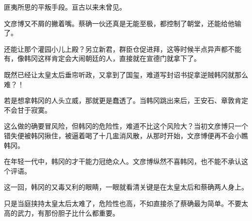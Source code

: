 匪夷所思的平叛手段。亘古以来未曾见。

文彦博又不屑的撇着嘴。蔡确一伙还真是无能至极，都控制了朝堂，还能给他输了。

还能让那个灌园小儿上殿？另立新君，群臣仓促进拜，这等时候半点异声都不能有，像韩冈这样肯定会大闹朝廷的人，直接就在宣德门就拿下了。

既然已经让太皇太后垂帘听政，又拿到了国玺，难道写封诏书捉拿逆贼韩冈就那么难？！

若是想拿韩冈的人头立威，那就更是蠢透了。当韩冈跳出来后，王安石、章敦肯定不会甘于寂寞。

这么做的确要冒风险，但韩冈的危险性，难道不比这个风险大？当初文彦博只一个错失便被韩冈揪住，被逼着喝了十几盅消风散，从那时开始，文彦博便再不会小瞧韩冈。

在年轻一代中，韩冈的才干能力冠绝众人。文彦博纵然不喜韩冈，也不能不承认这个评语。

这一回，韩冈的又毒又利的眼睛，一眼就看清关键是在太皇太后和蔡确两人身上。

只是当庭挟持太皇太后太难了，危险性也高，不如直接杀了蔡确最为简单。不要太高的武力，有那份胆子比什么都重要。

